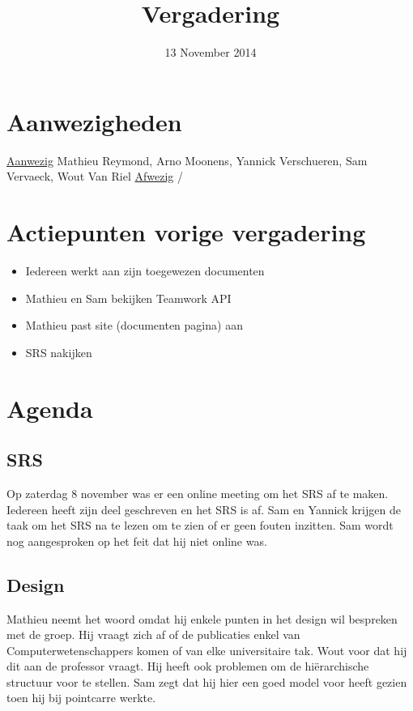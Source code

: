 \title{Vergadering}
\author{}
\date{13 November 2014}



\maketitle

\section{Aanwezigheden}
\underline{Aanwezig}  \newline
Mathieu Reymond, Arno Moonens, Yannick Verschueren, Sam Vervaeck, Wout Van Riel
\newline
\underline{Afwezig} \newline
/

\section{Actiepunten vorige vergadering}
\begin{itemize}
\item Iedereen werkt aan zijn toegewezen documenten 
\item Mathieu en Sam bekijken Teamwork API
\item Mathieu past site (documenten pagina) aan
\item SRS nakijken
\end{itemize}

\section{Agenda}
\subsection{SRS}
Op zaterdag 8 november was er een online meeting om het SRS af te maken. Iedereen heeft zijn deel geschreven en het SRS is af. Sam en Yannick krijgen de taak om het SRS na te lezen om te zien of er geen fouten inzitten. Sam wordt nog aangesproken op het feit dat hij niet online was.

\subsection{Design}
Mathieu neemt het woord omdat hij enkele punten in het design wil bespreken met de groep.
Hij vraagt zich af of de publicaties enkel van Computerwetenschappers komen of van elke universitaire tak. Wout voor dat hij dit aan de professor vraagt. Hij heeft ook problemen om de hiërarchische structuur voor te stellen. Sam zegt dat hij hier een goed model voor heeft gezien toen hij bij pointcarre werkte. 

